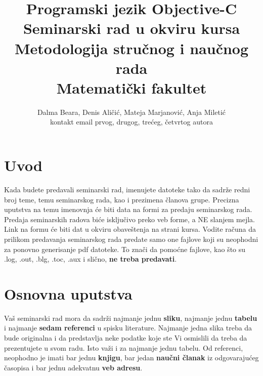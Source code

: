 \documentclass[a4paper]{article}
\begin{document}
\title{Programski jezik Objective-C\\ \small{Seminarski rad u okviru kursa\\Metodologija stručnog i naučnog rada\\ Matematički fakultet}}

\author{Dalma Beara, Denis Aličić, Mateja Marjanović, Anja Miletić\\ kontakt email prvog, drugog, trećeg, četvrtog autora}


\maketitle


\tableofcontents

\newpage

\section{Uvod}
\label{sec:uvod}

Kada budete predavali seminarski rad, imenujete datoteke tako da sadrže redni broj teme, temu seminarskog rada, kao i prezimena članova grupe. Precizna uputstva na temu imenovnja će biti data na formi za predaju seminarskog rada. Predaja seminarskih radova biće isključivo preko veb forme, a NE slanjem mejla. Link na formu će biti dat u okviru obaveštenja na strani kursa. Vodite računa da prilikom predavanja seminarskog rada predate samo one fajlove koji su neophodni za ponovno generisanje pdf datoteke. To znači da pomoćne fajlove, kao što su .log, .out, .blg, .toc, .aux i slično, \textbf{ne treba predavati}.

\section{Osnovna uputstva}
Vaš seminarski rad mora da sadrži najmanje jednu \textbf{sliku}, najmanje jednu \textbf{tabelu} i najmanje \textbf{sedam referenci} u spisku literature. Najmanje jedna slika treba da bude originalna i da predstavlja neke podatke koje ste Vi osmislili da treba da prezentujete u svom radu. Isto važi i za najmanje jednu tabelu. 	Od referenci, neophodno je imati bar jednu \textbf{knjigu}, bar jedan \textbf{naučni članak} iz odgovarajućeg časopisa i bar jednu adekvatnu \textbf{veb adresu}. 
\end{document}
